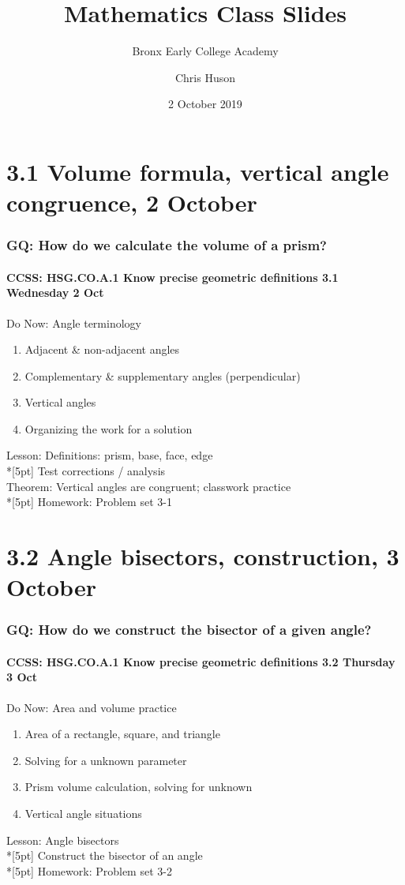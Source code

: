 \documentclass{beamer}
\title{Mathematics Class Slides}
\subtitle{Bronx Early College Academy}
\author{Chris Huson}
\date{2 October 2019}
\begin{document}
\frame{\titlepage}
\section[Outline]{}
\frame{\tableofcontents}

\section{3.1 Volume formula, vertical angle congruence, 2 October}
  \frame
  {
    \frametitle{GQ: How do we calculate the volume of a prism?}
    \framesubtitle{CCSS: HSG.CO.A.1 Know precise geometric definitions \hfill \alert{3.1 Wednesday 2 Oct}}

    \begin{block}{Do Now: Angle terminology}
    \begin{enumerate}
      \item Adjacent \& non-adjacent angles
      \item Complementary \& supplementary angles (perpendicular)
      \item Vertical angles
      \item Organizing the work for a solution
    \end{enumerate}
    \end{block}
    Lesson: Definitions: prism, base, face, edge  \\*[5pt]
    Test corrections / analysis\\
    Theorem: Vertical angles are congruent; classwork practice\\*[5pt]
    Homework: Problem set 3-1 
  }

  \section{3.2 Angle bisectors, construction, 3 October}
    \frame
    {
      \frametitle{GQ: How do we construct the bisector of a given angle?}
      \framesubtitle{CCSS: HSG.CO.A.1 Know precise geometric definitions \hfill \alert{3.2 Thursday 3 Oct}}

      \begin{block}{Do Now: Area and volume practice}
      \begin{enumerate}
        \item Area of a rectangle, square, and triangle
        \item Solving for a unknown parameter
        \item Prism volume calculation, solving for unknown
        \item Vertical angle situations
      \end{enumerate}
      \end{block}
      Lesson: Angle bisectors  \\*[5pt]
      Construct the bisector of an angle\\*[5pt]
      Homework: Problem set 3-2
    }
\end{document}
